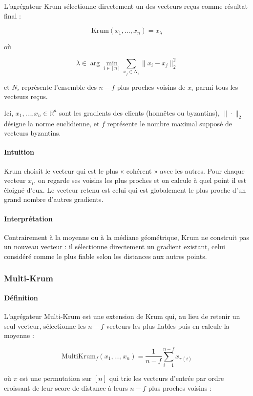 \documentclass[a4paper,11pt]{article}
\begin{document}
L'agrégateur Krum sélectionne directement un des vecteurs reçus comme résultat final :

\[
\mathrm{Krum}(x_1,\dots,x_n) = x_{\lambda}
\]

où

\[
\lambda \in \arg\min_{i \in [n]} \sum_{x_j \in N_i} \|x_i - x_j\|_2^2
\]

et $N_i$ représente l'ensemble des $n-f$ plus proches voisins de $x_i$ parmi tous les vecteurs reçus.

Ici, $x_1,\dots,x_n \in \mathbb{R}^d$ sont les gradients des clients (honnêtes ou byzantins), $\|\cdot\|_2$ désigne la norme euclidienne, et $f$ représente le nombre maximal supposé de vecteurs byzantins.

\paragraph{Intuition}

Krum choisit le vecteur qui est le plus « cohérent » avec les autres. Pour chaque vecteur $x_i$, on regarde ses voisins les plus proches et on calcule à quel point il est éloigné d'eux. Le vecteur retenu est celui qui est globalement le plus proche d'un grand nombre d'autres gradients.

\paragraph{Interprétation}

Contrairement à la moyenne ou à la médiane géométrique, Krum ne construit pas un nouveau vecteur : il sélectionne directement un gradient existant, celui considéré comme le plus fiable selon les distances aux autres points.

\subsubsection{Multi-Krum}

\paragraph{Définition}

L'agrégateur Multi-Krum est une extension de Krum qui, au lieu de retenir un seul vecteur, sélectionne les $n-f$ vecteurs les plus fiables puis en calcule la moyenne :

\[
\mathrm{MultiKrum}_f(x_1,\dots,x_n) = \frac{1}{n-f}\sum_{i=1}^{n-f} x_{\pi(i)}
\]

où $\pi$ est une permutation sur $[n]$ qui trie les vecteurs d'entrée par ordre croissant de leur score de distance à leurs $n-f$ plus proches voisins :
\end{document}
